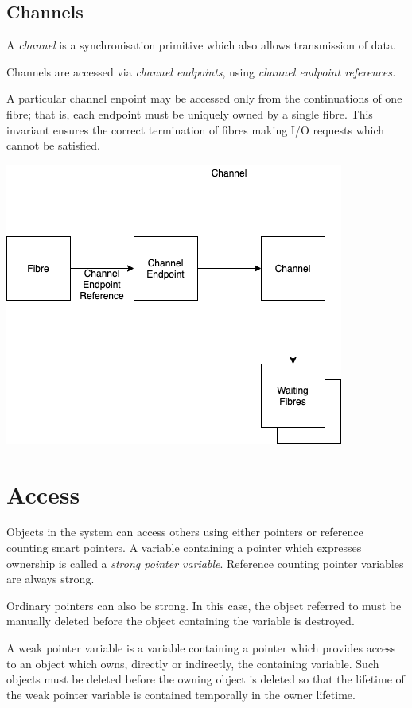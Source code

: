\documentclass[oneside]{book}
\begin{document}
\section{Channels}

A {\em channel} is a synchronisation primitive which also allows transmission
of data.\

Channels are accessed via {\em channel endpoints}, using {\em channel endpoint references.}

A particular channel enpoint may be accessed only from the continuations
of one fibre; that is, each endpoint must be uniquely owned by a single
fibre. This invariant ensures the correct termination of fibres
making I/O requests which cannot be satisfied. 

\includegraphics{../src/tex/channel.png}

\chapter{Access}
Objects in the system can access others using either pointers
or reference counting smart pointers. A variable containing a pointer
which expresses ownership is called a {\em strong pointer variable}.
Reference counting pointer variables are always strong.

Ordinary pointers can also be strong. In this case, the object referred
to must be manually deleted before the object containing the variable
is destroyed.

A weak pointer variable is a variable containing a pointer which provides
access to an object which owns, directly or indirectly, the containing
variable. Such objects must be deleted before the owning object is deleted
so that the lifetime of the weak pointer variable is contained temporally
in the owner lifetime.
\end{document}
